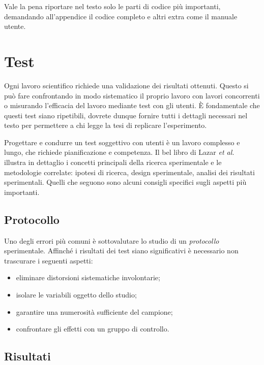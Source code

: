 \documentclass[12pt]{report}
\begin{document}
    Vale la pena riportare nel testo solo le parti di codice più importanti, demandando all'appendice il codice completo e altri extra come il manuale utente.

%
%


    \chapter{Test}
    \label{chap:test}

    Ogni lavoro scientifico richiede una validazione dei risultati ottenuti. Questo si può fare confrontando in modo sistematico il proprio lavoro con lavori concorrenti o misurando l'efficacia del lavoro mediante test con gli utenti. \`E fondamentale che questi test siano ripetibili, dovrete dunque fornire tutti i dettagli necessari nel testo per permettere a chi legge la tesi di replicare l'esperimento.

    Progettare e condurre un test soggettivo con utenti \`e un lavoro complesso e lungo, che richiede pianificazione e competenza. Il bel libro di Lazar {\em et al.}~\cite{lazar2017methods} illustra in dettaglio i concetti principali della ricerca sperimentale e le metodologie correlate: ipotesi di ricerca, design sperimentale, analisi dei risultati sperimentali. Quelli che seguono sono alcuni consigli specifici sugli aspetti pi\`u importanti.


    \section{Protocollo}

    Uno degli errori più comuni è sottovalutare lo studio di un \textit{protocollo} sperimentale. Affinché i risultati dei test siano significativi è necessario non trascurare i seguenti aspetti:

    \begin{itemize}
        \item eliminare distorsioni sistematiche involontarie;
        \item isolare le variabili oggetto dello studio;
        \item garantire una numerosità sufficiente del campione;
        \item confrontare gli effetti con un gruppo di controllo.
    \end{itemize}


    \section{Risultati}
\end{document}
